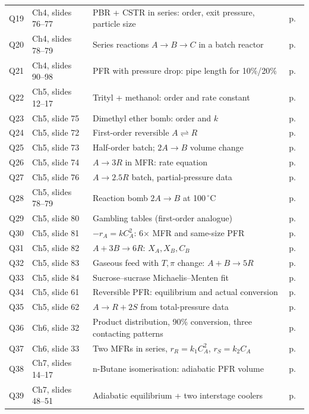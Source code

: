 \documentclass[10pt,a4paper]{article}
\begin{document}
\begin{footnotesize}
\begin{tabularx}{\linewidth}{@{}l l X r@{}}
Q19 & Ch4, slides 76--77 & PBR + CSTR in series: order, exit pressure, particle size & p.~\pageref{q:19}\\
Q20 & Ch4, slides 78--79 & Series reactions $A\to B\to C$ in a batch reactor & p.~\pageref{q:20}\\
Q21 & Ch4, slides 90--98 & PFR with pressure drop: pipe length for 10\%/20\% & p.~\pageref{q:21}\\
Q22 & Ch5, slides 12--17 & Trityl + methanol: order and rate constant & p.~\pageref{q:22}\\
Q23 & Ch5, slide 75 & Dimethyl ether bomb: order and $k$ & p.~\pageref{q:23}\\
Q24 & Ch5, slide 72 & First-order reversible $A\rightleftharpoons R$ & p.~\pageref{q:24}\\
Q25 & Ch5, slide 73 & Half-order batch; $2A\to B$ volume change & p.~\pageref{q:25}\\
Q26 & Ch5, slide 74 & $A\to3R$ in MFR: rate equation & p.~\pageref{q:26}\\
Q27 & Ch5, slide 76 & $A\to2.5R$ batch, partial-pressure data & p.~\pageref{q:27}\\
Q28 & Ch5, slides 78--79 & Reaction bomb $2A\to B$ at 100\,$^\circ$C & p.~\pageref{q:28}\\
Q29 & Ch5, slide 80 & Gambling tables (first-order analogue) & p.~\pageref{q:29}\\
Q30 & Ch5, slide 81 & $-r_A=kC_A^2$: 6$\times$ MFR and same-size PFR & p.~\pageref{q:30}\\
Q31 & Ch5, slide 82 & $A+3B\to6R$: $X_A,X_B,C_B$ & p.~\pageref{q:31}\\
Q32 & Ch5, slide 83 & Gaseous feed with $T,\pi$ change: $A+B\to5R$ & p.~\pageref{q:32}\\
Q33 & Ch5, slide 84 & Sucrose--sucrase Michaelis--Menten fit & p.~\pageref{q:33}\\
Q34 & Ch5, slide 61 & Reversible PFR: equilibrium and actual conversion & p.~\pageref{q:34}\\
Q35 & Ch5, slide 62 & $A\to R+2S$ from total-pressure data & p.~\pageref{q:35}\\
Q36 & Ch6, slide 32 & Product distribution, 90\% conversion, three contacting patterns & p.~\pageref{q:36}\\
Q37 & Ch6, slide 33 & Two MFRs in series, $r_R=k_1C_A^2$, $r_S=k_2C_A$ & p.~\pageref{q:37}\\
Q38 & Ch7, slides 14--17 & n-Butane isomerisation: adiabatic PFR volume & p.~\pageref{q:38}\\
Q39 & Ch7, slides 48--51 & Adiabatic equilibrium + two interstage coolers & p.~\pageref{q:39}\\

\end{tabularx}
\end{footnotesize}
\end{document}
